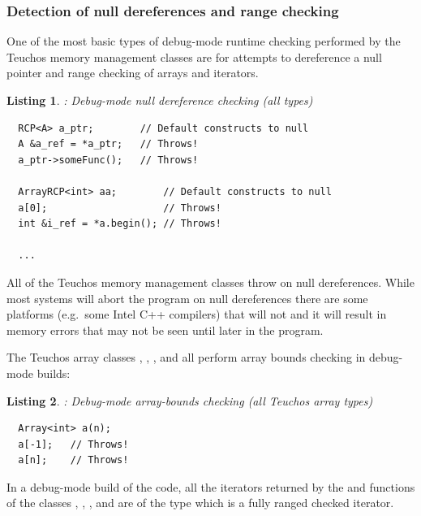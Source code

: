 \documentclass[pdf,ps2pdf,11pt]{SANDreport}
\newtheorem{listing}{Listing}
\begin{document}
%
{}\subsubsection{Detection of null dereferences and range checking}
\label{sec:null-dereferences-range-checking}
%

One of the most basic types of debug-mode runtime checking performed
by the Teuchos memory management classes are for attempts to
dereference a null pointer and range checking of arrays and iterators.

\begin{listing}: Debug-mode null dereference checking (all types) \\
\label{listing:null-deref}
{\small\begin{verbatim}
  RCP<A> a_ptr;        // Default constructs to null
  A &a_ref = *a_ptr;   // Throws!
  a_ptr->someFunc();   // Throws!

  ArrayRCP<int> aa;        // Default constructs to null
  a[0];                    // Throws!
  int &i_ref = *a.begin(); // Throws!

  ...  
\end{verbatim}}
\end{listing}

All of the Teuchos memory management classes throw on null
dereferences.  While most systems will abort the program on null
dereferences there are some platforms (e.g.\ some Intel C++ compilers)
that will not and it will result in memory errors that may not be seen
until later in the program.

The Teuchos array classes {}, {},
{}, and {} all perform array bounds
checking in debug-mode builds:

\begin{listing}: Debug-mode array-bounds checking (all Teuchos array types) \\
\label{listing:array-bounds-checking}
{\small\begin{verbatim}
  Array<int> a(n);
  a[-1];   // Throws!
  a[n];    // Throws!
\end{verbatim}}
\end{listing}

In a debug-mode build of the code, all the iterators returned by the
{} and {} functions of the classes
{}, {}, {}, and
{} are of the type {} which is a fully
ranged checked iterator.
\end{document}
